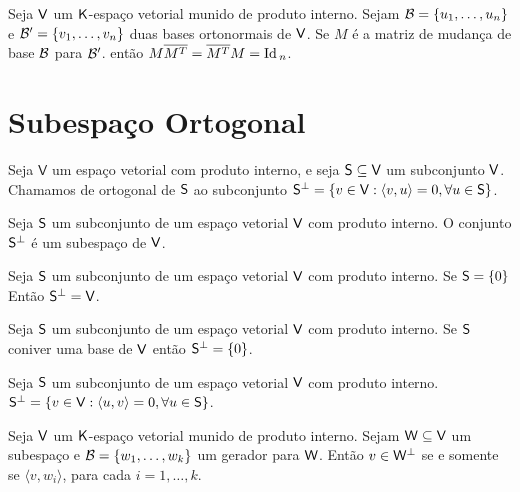 \documentclass[10pt,a4paper]{book}
\begin{document}
\begin{corollary}
	Seja $\mathsf{ V }$ um $\mathsf{ K }$-espaço vetorial munido de produto interno. Sejam $\mathcal{ B } = \{ u_1,\dots, u_n \}$ e $\mathcal{ B }' = \{ v_1,\dots, v_n \}$ duas bases ortonormais de $\mathsf{ V }$. Se $M$ é a matriz de mudança de base $\mathcal{ B }$ para $\mathcal{ B }'$. então $M \overline{M ^ T} = \overline{M ^ T} M = \mathrm{ Id }\,_n$.
\end{corollary}




\section{Subespaço Ortogonal}

\begin{definition}
	Seja $\textsf{V}$ um espaço vetorial com produto interno, e seja $\mathsf{ S } \subseteq \mathsf{ V }$ um subconjunto $\mathsf{ V }$. Chamamos de ortogonal de $\mathsf{ S }$ ao subconjunto $\mathsf{ S } ^ \perp = \{ v \in \mathsf{ V } : \langle v, u \rangle = 0, \forall u \in \mathsf{ S } \}$.
\end{definition}

\begin{lemma}
	Seja $\mathsf{ S }$ um subconjunto de um espaço vetorial $\mathsf{ V }$ com produto interno. O conjunto $\mathsf{ S } ^ \perp$ é um subespaço de $\mathsf{ V }$.
\end{lemma}

\begin{lemma}
	Seja $\mathsf{ S }$ um subconjunto de um espaço vetorial $\mathsf{ V }$ com produto interno. Se $\mathsf{ S } = \{ 0 \}$ Então $\mathsf{ S } ^ \perp = \mathsf{ V }$.
\end{lemma}

\begin{lemma}
	Seja $\mathsf{ S }$ um subconjunto de um espaço vetorial $\mathsf{ V }$ com produto interno. Se $\mathsf{ S }$ coniver uma base de $\mathsf{ V }$ então $\mathsf{ S } ^ \perp = \{ 0 \}$.
\end{lemma}

\begin{lemma}
	Seja $\mathsf{ S }$ um subconjunto de um espaço vetorial $\mathsf{ V }$ com produto interno. $\mathsf{ S } ^ \perp = \{ v \in \mathsf{ V } : \langle u, v \rangle = 0, \forall u \in \mathsf{ S } \}$.
\end{lemma}

\begin{proposition}
	Seja $\mathsf{ V }$ um $\mathsf{ K }$-espaço vetorial munido de produto interno. Sejam $\mathsf{ W } \subseteq \mathsf{ V }$ um subespaço e $\mathcal{ B } = \{ w_1,\dots, w_k \}$ um gerador para $\mathsf{ W }$. Então $v \in \mathsf{ W } ^ \perp$ se e somente se $\langle v, w_i \rangle$, para cada $i = 1, \dots, k$.
\end{proposition}
\end{document}
